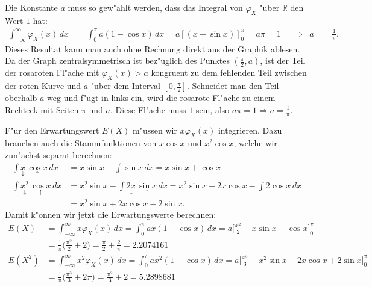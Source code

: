 \begin{loesung}
\begin{teilaufgaben}
\item
Die Konstante $a$ muss so gew"ahlt werden, dass das Integral von $\varphi_X$
"uber $\mathbb R$ den Wert $1$ hat:
\begin{align*}
\int_{-\infty}^{\infty}\varphi_X(x)\,dx
&=
\int_0^\pi a(1-\cos x)\,dx
=
a\left[
(x-\sin x)
\right]_0^\pi
=a\pi= 1
&&\Rightarrow&a&=\frac1{\pi}.
\end{align*}
Dieses Resultat kann man auch ohne Rechnung direkt aus der Graphik
ablesen.
Da der Graph zentralsymmetrisch ist bez"uglich des Punktes $(\frac{\pi}2,a)$,
ist der Teil der rosaroten Fl"ache mit $\varphi_X(x)>a$ kongruent
zu dem fehlenden Teil zwischen der roten Kurve und $a$ "uber dem
Interval $[0,\frac{\pi}2]$.
Schneidet man den Teil oberhalb $a$ weg und f"ugt in links ein, wird
die rosarote Fl"ache zu einem Rechteck mit Seiten $\pi$ und $a$.
Diese Fl"ache muss $1$ sein, also $a\pi=1\Rightarrow a=\frac1{\pi}$.
\item
F"ur den Erwartungswert $E(X)$ m"ussen wir $x\varphi_X(x)$ integrieren.
Dazu brauchen auch die Stammfunktionen von $x\cos x$ und $x^2\cos x$,
welche wir zun"achst separat berechnen:
\begin{align*}
\int \underset{\displaystyle\downarrow}{x}\,\underset{\displaystyle\uparrow}{\cos x}\,dx
&=
x\sin x -\int \sin x\,dx
=
x\sin x +\cos x
\\
\int \underset{\displaystyle\downarrow}{x^2}\,\underset{\displaystyle\uparrow}{\cos x}\,dx
&=
x^2\sin x-\int \underset{\displaystyle\downarrow}{2x}\,\underset{\displaystyle\uparrow}{\sin x}\,dx
=
x^2\sin x+2x\cos x-\int 2\cos x\,dx
\\
&=
x^2\sin x+2x\cos x-2\sin x.
\end{align*}
Damit k"onnen wir jetzt die Erwartungswerte berechnen:
\begin{align*}
E(X)
&=
\int_{-\infty}^{\infty}x\varphi_X(x)\,dx
=
\int_0^\pi ax(1-\cos x)\,dx
=
a\biggl[\frac{x^2}2
-x\sin x-\cos x
\biggr]_0^\pi
\\
&=
\frac1{\pi}\biggl(
\frac{\pi^2}{2}+2
\biggr)
=
\frac{\pi}{2}+\frac{2}{\pi}=2.2074161
\\
E(X^2)
&=
\int_{-\infty}^{\infty}x^2\varphi_X(x)\,dx
=
\int_0^\pi ax^2(1-\cos x)\,dx
=
a\biggl[\frac{x^3}3
-x^2\sin x-2x\cos x +2\sin x
\biggr]_0^\pi
\\
&=
\frac1{\pi}\biggl(
\frac{\pi^3}{3} +2\pi
\biggr)
=\frac{\pi^2}{3}+2=5.2898681
\end{align*}

\end{teilaufgaben}
\end{loesung}
